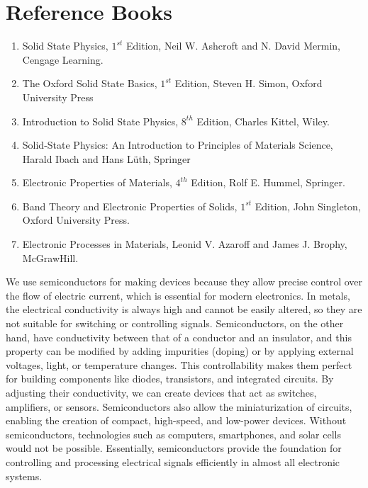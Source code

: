 \documentclass[a4aper,12pt]{report}
\begin{document}
\chapter*{Reference Books}
\vspace*{-2.7cm}
\thispagestyle{empty}
\begin{enumerate}
    \item Solid State Physics, $1^{st}$ Edition, Neil W. Ashcroft and N. David Mermin, Cengage Learning.
    \item The Oxford Solid State Basics, $1^{st}$ Edition, Steven H. Simon, Oxford University Press
    \item Introduction to Solid State Physics, $8^{th}$ Edition, Charles Kittel, Wiley.
    \item Solid-State Physics: An Introduction to Principles of Materials Science, Harald Ibach and Hans Lüth, Springer
    \item Electronic Properties of Materials, $4^{th}$ Edition, Rolf E. Hummel, Springer.
    \item Band Theory and Electronic Properties of Solids, $1^{st}$ Edition, John Singleton, Oxford University Press.
    \item Electronic Processes in Materials, Leonid V. Azaroff and James J. Brophy, McGrawHill.
\end{enumerate}
\tableofcontents 
\thispagestyle{empty}
\newpage
\setcounter{page}{1}
\begin{tcolorbox}[breakable, title = \textbf{Q1. }Why we use semi-conductors for making devices?]
    We use semiconductors for making devices because they allow precise control over the flow of electric current, which is essential for modern electronics. In metals, the electrical conductivity is always high and cannot be easily altered, so they are not suitable for switching or controlling signals. Semiconductors, on the other hand, have conductivity between that of a conductor and an insulator, and this property can be modified by adding impurities (doping) or by applying external voltages, light, or temperature changes. This controllability makes them perfect for building components like diodes, transistors, and integrated circuits. By adjusting their conductivity, we can create devices that act as switches, amplifiers, or sensors. Semiconductors also allow the miniaturization of circuits, enabling the creation of compact, high-speed, and low-power devices. Without semiconductors, technologies such as computers, smartphones, and solar cells would not be possible. Essentially, semiconductors provide the foundation for controlling and processing electrical signals efficiently in almost all electronic systems.
\end{tcolorbox}
\end{document}
